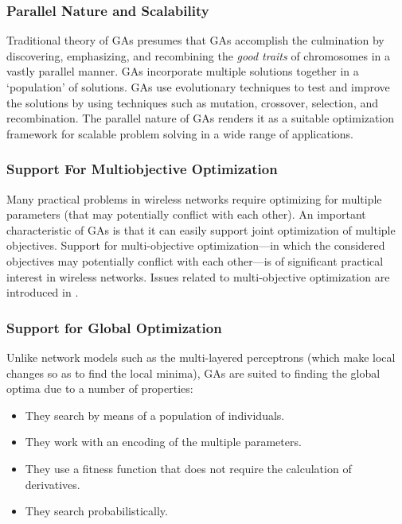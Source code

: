 \documentclass[journal]{IEEEtran}
\begin{document}
\vspace{2mm}
\subsubsection{Parallel Nature and Scalability} 

Traditional theory of GAs presumes that GAs accomplish the culmination by discovering, emphasizing, and recombining the \emph{good traits} of chromosomes in a vastly parallel manner. GAs incorporate multiple solutions together in a `population' of solutions. GAs use evolutionary techniques to test and improve the solutions by using techniques such as mutation, crossover, selection, and recombination. The parallel nature of GAs renders it as a suitable optimization framework for scalable problem solving in a wide range of applications.

\vspace{2mm}
\subsubsection{Support For Multiobjective Optimization}

Many practical problems in wireless networks require optimizing for multiple parameters (that may potentially conflict with each other). An important characteristic of GAs is that it can easily support joint optimization of multiple objectives. Support for multi-objective optimization---in which the considered objectives may potentially conflict with each other---is of significant practical interest in wireless networks. Issues related to multi-objective optimization are introduced in \cite{konak2006multi}.

\vspace{2mm}
\subsubsection{Support for Global Optimization} 

Unlike network models such as the multi-layered perceptrons (which make local changes so as to find the local minima), GAs are suited to finding the global optima due to a number of properties:

\begin{itemize}
\item They search by means of a population of individuals.
\item They work with an encoding of the multiple parameters.
\item They use a fitness function that does not require the calculation of derivatives.
\item They search probabilistically. 
\end{itemize}
\end{document}
